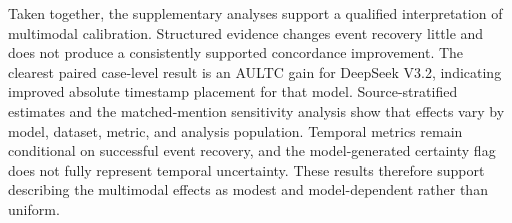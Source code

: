 \noindent
Taken together, the supplementary analyses support a qualified interpretation of multimodal calibration. Structured evidence changes event recovery little and does not produce a consistently supported concordance improvement. The clearest paired case-level result is an AULTC gain for DeepSeek V3.2, indicating improved absolute timestamp placement for that model. Source-stratified estimates and the matched-mention sensitivity analysis show that effects vary by model, dataset, metric, and analysis population. Temporal metrics remain conditional on successful event recovery, and the model-generated certainty flag does not fully represent temporal uncertainty. These results therefore support describing the multimodal effects as modest and model-dependent rather than uniform.

\endgroup